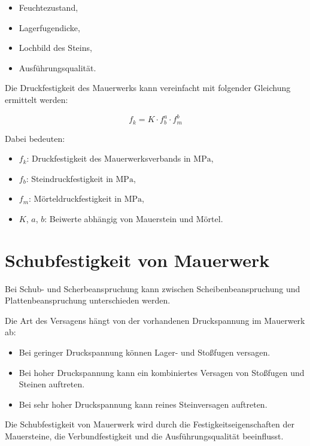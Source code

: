 \documentclass[
  12pt,
  a4paper,
  oneside
]{scrreprt}
\begin{document}
\begin{itemize}
  \item Feuchtezustand,
  \item Lagerfugendicke,
  \item Lochbild des Steins,
  \item Ausführungsqualität.
\end{itemize}



Die Druckfestigkeit des Mauerwerks kann vereinfacht mit folgender
Gleichung ermittelt werden:

\begin{equation}
  f_k =
  K \cdot f_b^a \cdot f_m^b
\end{equation}

Dabei bedeuten:

\begin{itemize}
  \item \(f_k\): Druckfestigkeit des Mauerwerksverbands in
  \(\mathrm{MPa}\),
  \item \(f_b\): Steindruckfestigkeit in \(\mathrm{MPa}\),
  \item \(f_m\): Mörteldruckfestigkeit in \(\mathrm{MPa}\),
  \item \(K\), \(a\), \(b\): Beiwerte abhängig von Mauerstein und
  Mörtel.
\end{itemize}



\section{Schubfestigkeit von Mauerwerk}

Bei Schub- und Scherbeanspruchung kann zwischen Scheibenbeanspruchung
und Plattenbeanspruchung unterschieden werden.


Die Art des Versagens hängt von der vorhandenen Druckspannung im
Mauerwerk ab:

\begin{itemize}
  \item Bei geringer Druckspannung können Lager- und Stoßfugen
  versagen.
  \item Bei hoher Druckspannung kann ein kombiniertes Versagen von
  Stoßfugen und Steinen auftreten.
  \item Bei sehr hoher Druckspannung kann reines Steinversagen
  auftreten.
\end{itemize}



Die Schubfestigkeit von Mauerwerk wird durch die Festigkeitseigenschaften
der Mauersteine, die Verbundfestigkeit und die Ausführungsqualität
beeinflusst.
\end{document}
